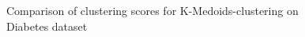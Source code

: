 \begin{figure}[H]
	\centering
	
	\caption{Comparison of clustering scores for K-Medoids-clustering on Diabetes dataset}%
	\label{fig:kmedoids_diabetes}
\end{figure}


